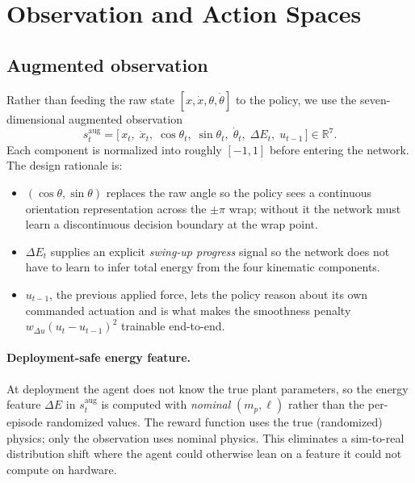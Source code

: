 \documentclass[11pt,a4paper]{article}
\begin{document}
\section{Observation and Action Spaces}

\subsection{Augmented observation}
\label{sec:obs}
Rather than feeding the raw state $[x,\dot{x},\theta,\dot{\theta}]$ to the policy, we use the seven-dimensional augmented observation
\begin{equation}
\boxed{\;
s^{\text{aug}}_t = \bigl[\, x_t,\; \dot{x}_t,\; \cos\theta_t,\; \sin\theta_t,\; \dot{\theta}_t,\; \Delta E_t,\; u_{t-1} \,\bigr] \in \mathbb{R}^7.
\;}
\end{equation}
Each component is normalized into roughly $[-1,1]$ before entering the network. The design rationale is:
\begin{itemize}[leftmargin=*,itemsep=2pt]
  \item $(\cos\theta,\sin\theta)$ replaces the raw angle so the policy sees a continuous orientation representation across the $\pm\pi$ wrap; without it the network must learn a discontinuous decision boundary at the wrap point.
  \item $\Delta E_t$ supplies an explicit \emph{swing-up progress} signal so the network does not have to learn to infer total energy from the four kinematic components.
  \item $u_{t-1}$, the previous applied force, lets the policy reason about its own commanded actuation and is what makes the smoothness penalty $w_{\Delta u}(u_t - u_{t-1})^2$ trainable end-to-end.
\end{itemize}

\paragraph{Deployment-safe energy feature.} At deployment the agent does not know the true plant parameters, so the energy feature $\Delta E$ in $s^{\text{aug}}_t$ is computed with \emph{nominal} $(m_p,\ell)$ rather than the per-episode randomized values. The reward function uses the true (randomized) physics; only the observation uses nominal physics. This eliminates a sim-to-real distribution shift where the agent could otherwise lean on a feature it could not compute on hardware.
\end{document}
